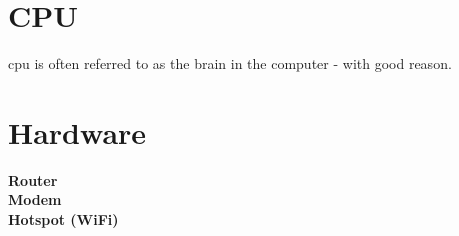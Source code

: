 \section{CPU}
\acrfull{cpu} is often referred to as the brain in the computer - with good reason. 

\section{Hardware}

\textbf{Router} \\

\textbf{Modem} \\

\textbf{Hotspot (WiFi)} \\




\newpage